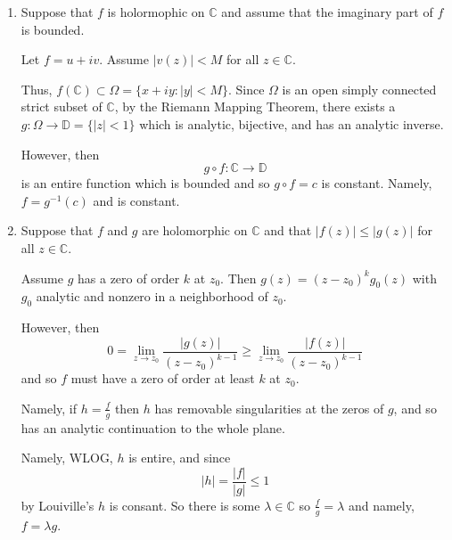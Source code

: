 \documentclass[12pt]{Homework}
\begin{document}
\begin{solution}$\,$
\begin{enumerate}[label=(\alph*)]
    \item Suppose that $f$ is holormophic on $\mathbb{C}$ and assume that the imaginary part of $f$ is bounded.
    
    Let $f=u+iv$. Assume $|v(z)|< M$ for all $z\in\mathbb{C}$.
    
    Thus, $f(\mathbb{C})\subset\Omega=\{x+iy:|y|<M\}$. Since $\Omega$ is an open simply connected strict subset of $\mathbb{C}$, by the Riemann Mapping Theorem, there exists a $g:\Omega\to\mathbb{D}=\{|z|<1\}$ which is analytic, bijective, and has an analytic inverse.
    
    However, then $$g\circ f:\mathbb{C}\to\mathbb{D}$$ is an entire function which is bounded and so $g\circ f=c$ is constant. Namely, $f=g^{-1}(c)$ and is constant.

    \item Suppose that $f$ and $g$ are holomorphic on $\mathbb{C}$ and that $|f(z)|\le|g(z)|$ for all $z\in\mathbb{C}$. 
    
    Assume $g$ has a zero of order $k$ at $z_0$. Then $g(z)=(z-z_0)^kg_0(z)$ with $g_0$ analytic and nonzero in a neighborhood of $z_0$. 
    
    However, then $$0=\lim_{z\to z_0}\frac{|g(z)|}{(z-z_0)^{k-1}}\ge\lim_{z\to z_0}\frac{|f(z)|}{(z-z_0)^{k-1}}$$ and so $f$ must have a zero of order at least $k$ at $z_0$.
    
    Namely, if $h=\frac{f}{g}$ then $h$ has removable singularities at the zeros of $g$, and so has an analytic continuation to the whole plane. 
    
    Namely, WLOG, $h$ is entire, and since $$|h|=\frac{|f|}{|g|}\le 1$$ by Louiville's $h$ is consant. So there is some $\lambda\in\mathbb{C}$
    so $\frac{f}{g}=\lambda$ and namely, $f=\lambda g$.
\end{enumerate}
\end{solution}
\end{document}

